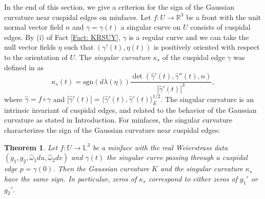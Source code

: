 \documentclass[11pt,reqno]{amsart}
\theoremstyle{plain} %
\newtheorem{theorem}{Theorem}[section]
\theoremstyle{definition}
\begin{document}
In the end of this section, we give a criterion for the sign of the Gaussian curvature near cuspidal edges on minfaces. Let $f:U \longrightarrow \mathbb{R}^3$ be a front with the unit normal vector field $n$ and $\gamma=\gamma(t)$ a singular curve on $U$ consists of cuspidal edges. By (i) of Fact \ref{Fact: KRSUY}, $\gamma$ is a regular curve and we can take the null vector fields $\eta$ such that $(\gamma'(t), \eta(t))$ is positively oriented with respect to the orientation of $U$.
The {\it singular curvature} $\kappa_s$ of the cuspidal edge $\gamma$ was defined in \cite{SUY09} as
\begin{equation*}
\kappa_s(t)=\mathrm{sgn}(d\lambda(\eta))\frac{\det(\hat{\gamma}'(t),\hat{\gamma}''(t),n)}{|\hat{\gamma}'(t)|^3},
\end{equation*}
where $\hat{\gamma}=f\circ \gamma$ and $|\hat{\gamma}'(t)|=\langle\hat{\gamma}'(t),\hat{\gamma}'(t) \rangle_E^{1/2}$. The singular curvature is an intrinsic invariant of cuspidal edges, and related to the behavior of the Gaussian curvature as stated in Introduction. For minfaces, the singular curvature characterizes the sign of the Gaussian curvature near cuspidal edges:

\begin{theorem}\label{Theorem: Gaussian curvature near cusps}
Let $f:U \longrightarrow \mathbb{L}^3$ be a minface with the real Weierstrass data $(g_1, g_2,\hat{\omega}_1du, \hat{\omega}_2dv)$ and $\gamma(t)$ the singular curve passing through a cuspidal edge $p=\gamma(0)$. Then the Gaussian curvature $K$ and the singular curvature $\kappa_s$ have the same sign. In particular, zeros of $\kappa_s$ correspond to either zeros of $g_1'$ or $g_2'$. 
\end{theorem}
\end{document}
